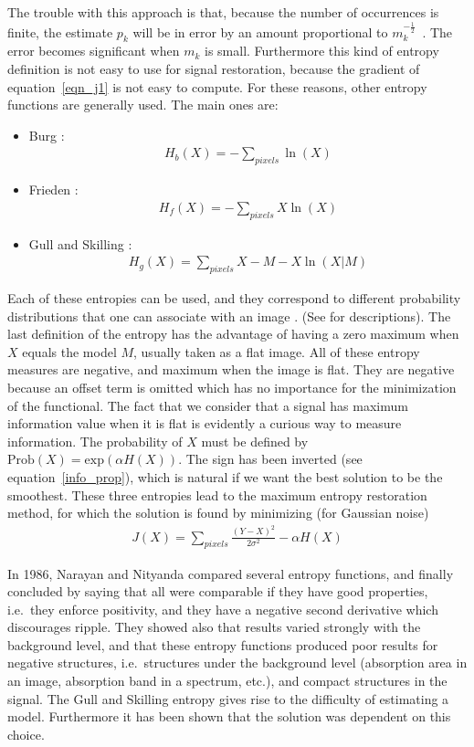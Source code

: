 \documentclass[11pt,a4paper]{article}
\begin{document}
The trouble with this approach is that, because the number of occurrences is
finite, the estimate $p_k$ will be in error by an amount proportional
to $m_k^{-\frac{1}{2}}$~\cite{frieden}. The error becomes significant when
$m_k$ is small. Furthermore this kind of entropy definition is not
easy to use for signal restoration, because the gradient of 
equation~\ref{eqn_j1} is not easy to compute. For these reasons, other
entropy functions are generally used. The main ones are:
\begin{itemize}
\item Burg \cite{burg67}:
\begin{eqnarray}
H_b(X) = -\sum_{pixels} \ln(X) 
\end{eqnarray}
\item Frieden \cite{frieden75}:
\begin{eqnarray}
H_f(X) = -\sum_{pixels}X \ln(X)
\end{eqnarray}
\item Gull and Skilling \cite{gull91}:
\begin{eqnarray}
H_g(X) = \sum_{pixels} X - M - X \ln(X|M)
\end{eqnarray}
\end{itemize}
Each of these entropies can be used, and they correspond to different
probability distributions that one can associate with 
an image \cite{narrayan86}.
(See \cite{frieden75,skilling84_1,skilling89} for descriptions).
The last definition of the entropy has the advantage of having a zero
 maximum when $X$ equals the model $M$, usually taken as a flat image. 
All of these entropy measures are negative, and maximum when the image is flat.
They are negative because an offset term is omitted which has no importance
for the minimization of the functional. The fact that we consider that
a signal has maximum information value when it is flat is evidently
a curious way to measure information. The probability of $X$ 
must be defined by $\mathrm{Prob}(X) = \mathrm{exp}(\alpha H(X))$. The sign has 
been inverted
(see equation~\ref{info_prop}), which is natural if we want the best
solution to be  the smoothest. These three entropies lead to the 
maximum entropy restoration method, for which the 
solution is found by minimizing 
(for Gaussian noise)
\begin{eqnarray}
J(X) = \sum_{pixels} \frac{{(Y-X)}^{2}}{2 {\sigma}^{2}} - {\alpha} H(X)
\label{eqn_j3}
\end{eqnarray}

In 1986, Narayan and Nityanda \cite{narrayan86} 
compared several entropy functions,
 and finally 
concluded by saying that all were comparable if they have good
properties, i.e.\ they enforce positivity, and they have a negative 
second derivative which discourages ripple. They showed also that 
results varied strongly with the background level, and
that these entropy functions produced poor results
for negative structures, i.e.\ structures under the background level
(absorption area in an image, absorption band in a spectrum, etc.), and 
compact structures in the signal.
The Gull and Skilling entropy gives rise to  
the difficulty of estimating a model.
Furthermore it has been shown \cite{bontekoe94} 
that the solution was dependent on this choice.
\end{document}
